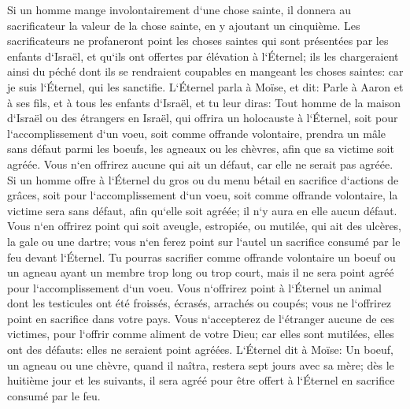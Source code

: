 \verse Si un homme mange involontairement d`une chose sainte, il donnera au sacrificateur la valeur de la chose sainte, en y ajoutant un cinquième. 
\verse Les sacrificateurs ne profaneront point les choses saintes qui sont présentées par les enfants d`Israël, et qu`ils ont offertes par élévation à l`Éternel; 
\verse ils les chargeraient ainsi du péché dont ils se rendraient coupables en mangeant les choses saintes: car je suis l`Éternel, qui les sanctifie. 
\verse L`Éternel parla à Moïse, et dit: 
\verse Parle à Aaron et à ses fils, et à tous les enfants d`Israël, et tu leur diras: Tout homme de la maison d`Israël ou des étrangers en Israël, qui offrira un holocauste à l`Éternel, soit pour l`accomplissement d`un voeu, soit comme offrande volontaire, 
\verse prendra un mâle sans défaut parmi les boeufs, les agneaux ou les chèvres, afin que sa victime soit agréée. 
\verse Vous n`en offrirez aucune qui ait un défaut, car elle ne serait pas agréée. 
\verse Si un homme offre à l`Éternel du gros ou du menu bétail en sacrifice d`actions de grâces, soit pour l`accomplissement d`un voeu, soit comme offrande volontaire, la victime sera sans défaut, afin qu`elle soit agréée; il n`y aura en elle aucun défaut. 
\verse Vous n`en offrirez point qui soit aveugle, estropiée, ou mutilée, qui ait des ulcères, la gale ou une dartre; vous n`en ferez point sur l`autel un sacrifice consumé par le feu devant l`Éternel. 
\verse Tu pourras sacrifier comme offrande volontaire un boeuf ou un agneau ayant un membre trop long ou trop court, mais il ne sera point agréé pour l`accomplissement d`un voeu. 
\verse Vous n`offrirez point à l`Éternel un animal dont les testicules ont été froissés, écrasés, arrachés ou coupés; vous ne l`offrirez point en sacrifice dans votre pays. 
\verse Vous n`accepterez de l`étranger aucune de ces victimes, pour l`offrir comme aliment de votre Dieu; car elles sont mutilées, elles ont des défauts: elles ne seraient point agréées. 
\verse L`Éternel dit à Moïse: 
\verse Un boeuf, un agneau ou une chèvre, quand il naîtra, restera sept jours avec sa mère; dès le huitième jour et les suivants, il sera agréé pour être offert à l`Éternel en sacrifice consumé par le feu. 
